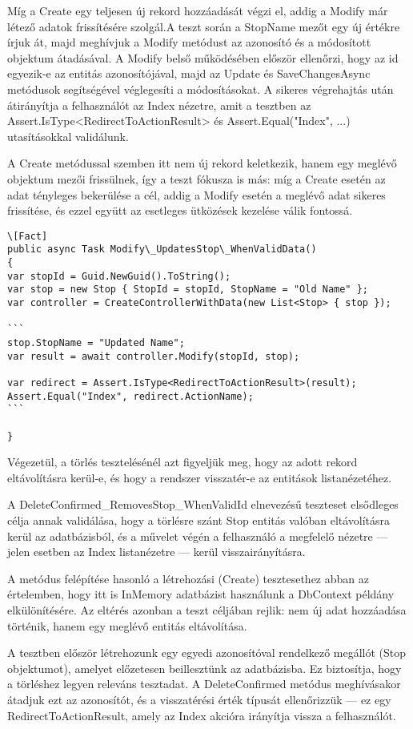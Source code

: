 Míg a Create egy teljesen új rekord hozzáadását végzi el, addig a Modify már létező adatok frissítésére szolgál.A teszt során a StopName mezőt egy új értékre írjuk át, majd meghívjuk a Modify metódust az azonosító és a módosított objektum átadásával. A Modify belső működésében először ellenőrzi, hogy az id egyezik-e az entitás azonosítójával, majd az Update és SaveChangesAsync metódusok segítségével véglegesíti a módosításokat. A sikeres végrehajtás után átirányítja a felhasználót az Index nézetre, amit a tesztben az Assert.IsType<RedirectToActionResult> és Assert.Equal("Index", ...) utasításokkal validálunk.

A Create metódussal szemben itt nem új rekord keletkezik, hanem egy meglévő objektum mezői frissülnek, így a teszt fókusza is más: míg a Create esetén az adat tényleges bekerülése a cél, addig a Modify esetén a meglévő adat sikeres frissítése, és ezzel együtt az esetleges ütközések kezelése válik fontossá.

\begin{lstlisting}
\[Fact]
public async Task Modify\_UpdatesStop\_WhenValidData()
{
var stopId = Guid.NewGuid().ToString();
var stop = new Stop { StopId = stopId, StopName = "Old Name" };
var controller = CreateControllerWithData(new List<Stop> { stop });

```
stop.StopName = "Updated Name";
var result = await controller.Modify(stopId, stop);

var redirect = Assert.IsType<RedirectToActionResult>(result);
Assert.Equal("Index", redirect.ActionName);
```

}
\end{lstlisting}

 Végezetül, a törlés tesztelésénél azt figyeljük meg, hogy az adott rekord eltávolításra kerül-e, és hogy a rendszer visszatér-e az entitások listanézetéhez.

A DeleteConfirmed\_RemovesStop\_WhenValidId elnevezésű teszteset elsődleges célja annak validálása, hogy a törlésre szánt Stop entitás valóban eltávolításra kerül az adatbázisból, és a művelet végén a felhasználó a megfelelő nézetre — jelen esetben az Index listanézetre — kerül visszairányításra.

A metódus felépítése hasonló a létrehozási (Create) tesztesethez abban az értelemben, hogy itt is InMemory adatbázist használunk a DbContext példány elkülönítésére. Az eltérés azonban a teszt céljában rejlik: nem új adat hozzáadása történik, hanem egy meglévő entitás eltávolítása.

A tesztben először létrehozunk egy egyedi azonosítóval rendelkező megállót (Stop objektumot), amelyet előzetesen beillesztünk az adatbázisba. Ez biztosítja, hogy a törléshez legyen releváns tesztadat. A DeleteConfirmed metódus meghívásakor átadjuk ezt az azonosítót, és a visszatérési érték típusát ellenőrizzük — ez egy RedirectToActionResult, amely az Index akcióra irányítja vissza a felhasználót.

